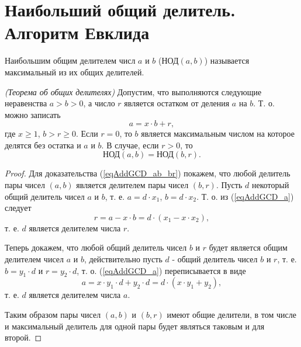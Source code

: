 \section{Наибольший общий делитель. Алгоритм Евклида}
\label{AddEuclidean}
\begin{definition}
Наибольшим общим делителем числ $a$ и $b$ ($\mbox{НОД}\left(a,
b\right)$) называется максимальный из их общих делителей.
\label{defAddGCD}
\end{definition}

\begin{theorem}
\emph{(Теорема об общих делителях)}
Допустим, что выполняются следующие неравенства
$a > b > 0$, а число $r$ является остатком от деления $a$ на
$b$. Т. о. можно записать 
\begin{equation}
a = x \cdot b + r,
\label{eqAddGCD_a}
\end{equation}
где $x \ge 1$, $b > r \ge 0$. Если $r=0$, то $b$ является максимальным числом на
которое делятся без остатка и $a$ и $b$. В случае, если $r > 0$, то
\begin{equation}
\mbox{НОД}\left(a, b\right) = \mbox{НОД}\left(b, r\right).
\label{eqAddGCD_ab_br}
\end{equation}
\end{theorem}

\begin{proof}
Для доказательства (\ref{eqAddGCD_ab_br}) покажем, что любой делитель
пары чисел $\left(a,b\right)$  является делителем пары чисел
$\left(b,r\right)$. Пусть $d$ некоторый общий делитель чисел  $a$ и
$b$, т. е. $a = d \cdot x_1$, $b = d \cdot x_2$. Т. о. из (\ref{eqAddGCD_a}) следует
\begin{equation}
r = a - x \cdot b = 
d \cdot \left( x_1 - x \cdot x_2 \right),
\nonumber
\end{equation}
т. е. $d$ является делителем числа $r$.

Теперь докажем, что любой общий делитель чисел $b$ и $r$ будет является общим
делителем чисел $a$ и $b$, действительно пусть $d$ - общий делитель
чисел $b$ и $r$, т. е. $b = y_1 \cdot d$ и  $r = y_2 \cdot d$,
т. о. (\ref{eqAddGCD_a}) переписывается в виде
\begin{equation}
a = x \cdot y_1 \cdot d + y_2 \cdot d = d \cdot \left( x \cdot y_1 +
y_2 \right),
\nonumber
\end{equation}
т. е. $d$ является делителем числа $a$.

Таким образом пары чисел  $\left(a,b\right)$  и $\left(b,r\right)$
имеют общие делители, в том числе и максимальный делитель для одной
пары будет являться таковым и для второй.  
\end{proof}

